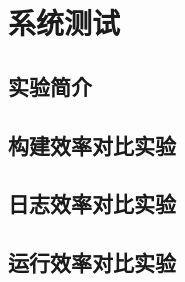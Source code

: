 \chapter{系统测试}  
\label{ch4}


\section{实验简介}
\section{构建效率对比实验}
\section{日志效率对比实验}
\section{运行效率对比实验}
